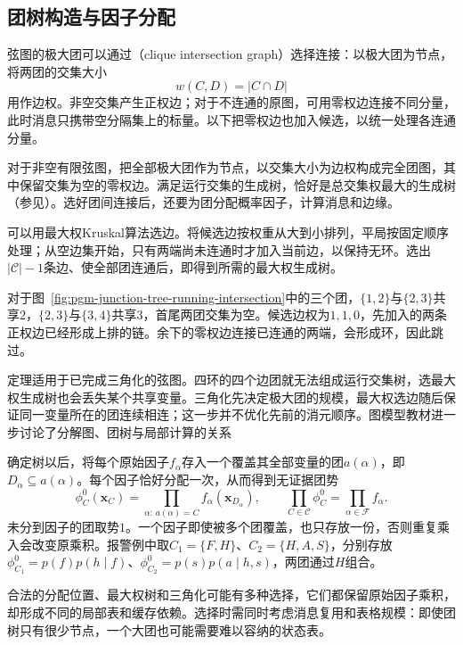 \subsection{团树构造与因子分配}
\label{sec:pgm-junction-tree-spanning-tree}

弦图的极大团可以通过（clique intersection graph）选择连接：以极大团为节点，将两团的交集大小
\[
  w(C,D)=|C\cap D|
\]
用作边权。非空交集产生正权边；对于不连通的原图，可用零权边连接不同分量，此时消息只携带空分隔集上的标量。以下把零权边也加入候选，以统一处理各连通分量。

对于非空有限弦图，把全部极大团作为节点，以交集大小为边权构成完全团图，其中保留交集为空的零权边。满足运行交集的生成树，恰好是总交集权最大的生成树（参见）。选好团间连接后，还要为团分配概率因子，计算消息和边缘。

可以用最大权Kruskal算法选边。将候选边按权重从大到小排列，平局按固定顺序处理；从空边集开始，只有两端尚未连通时才加入当前边，以保持无环。选出$|\mathcal C|-1$条边、使全部团连通后，即得到所需的最大权生成树。

对于图~\ref{fig:pgm-junction-tree-running-intersection}中的三个团，$\{1,2\}$与$\{2,3\}$共享$2$，$\{2,3\}$与$\{3,4\}$共享$3$，首尾两团交集为空。候选边权为$1,1,0$，先加入的两条正权边已经形成上排的链。余下的零权边连接已连通的两端，会形成环，因此跳过。

定理适用于已完成三角化的弦图。四环的四个边团就无法组成运行交集树，选最大权生成树也会丢失某个共享变量。三角化先决定极大团的规模，最大权选边随后保证同一变量所在的团连续相连；这一步并不优化先前的消元顺序。图模型教材进一步讨论了分解图、团树与局部计算的关系

确定树以后，将每个原始因子$f_\alpha$存入一个覆盖其全部变量的团$a(\alpha)$，即$D_\alpha\subseteq a(\alpha)$。每个因子恰好分配一次，从而得到无证据团势
\begin{equation}
  \phi_C^0(\bm{x}_C)
    =\prod_{\alpha:\,a(\alpha)=C}f_\alpha(\bm{x}_{D_\alpha}),
  \qquad
  \prod_{C\in\mathcal{C}}\phi_C^0
    =\prod_{\alpha\in\mathcal{F}}f_\alpha.
  \label{eq:pgm-junction-tree-factor-assignment}
\end{equation}
未分到因子的团取势$1$。一个因子即使被多个团覆盖，也只存放一份，否则重复乘入会改变原乘积。报警例中取$C_1=\{F,H\}$、$C_2=\{H,A,S\}$，分别存放$\phi_{C_1}^0=p(f)p(h\mid f)$、$\phi_{C_2}^0=p(s)p(a\mid h,s)$，两团通过$H$组合。

合法的分配位置、最大权树和三角化可能有多种选择，它们都保留原始因子乘积，却形成不同的局部表和缓存依赖。选择时需同时考虑消息复用和表格规模：即使团树只有很少节点，一个大团也可能需要难以容纳的状态表。


